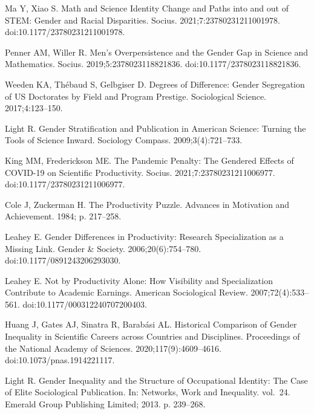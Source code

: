 \documentclass[
  10pt,
  letterpaper,
]{article}
\begin{document}
\begin{thebibliography}{10}
Ma Y, Xiao S.
\newblock Math and {{Science Identity Change}} and {{Paths}} into and out of {{STEM}}: {{Gender}} and {{Racial Disparities}}.
\newblock Socius. 2021;7:23780231211001978.
\newblock doi:{10.1177/23780231211001978}.

Penner AM, Willer R.
\newblock Men's {{Overpersistence}} and the {{Gender Gap}} in {{Science}} and {{Mathematics}}.
\newblock Socius. 2019;5:2378023118821836.
\newblock doi:{10.1177/2378023118821836}.

Weeden KA, Th{\'e}baud S, Gelbgiser D.
\newblock Degrees of Difference: {{Gender}} Segregation of {{US}} Doctorates by Field and Program Prestige.
\newblock Sociological Science. 2017;4:123--150.

Light R.
\newblock Gender Stratification and Publication in {{American}} Science: {{Turning}} the Tools of Science Inward.
\newblock Sociology Compass. 2009;3(4):721--733.

King MM, Frederickson ME.
\newblock The {{Pandemic Penalty}}: {{The Gendered Effects}} of {{COVID-19}} on {{Scientific Productivity}}.
\newblock Socius. 2021;7:23780231211006977.
\newblock doi:{10.1177/23780231211006977}.

Cole J, Zuckerman H.
\newblock The {{Productivity Puzzle}}.
\newblock Advances in Motivation and Achievement. 1984; p. 217--258.

Leahey E.
\newblock Gender {{Differences}} in {{Productivity}}: {{Research Specialization}} as a {{Missing Link}}.
\newblock Gender \& Society. 2006;20(6):754--780.
\newblock doi:{10.1177/0891243206293030}.

Leahey E.
\newblock Not by {{Productivity Alone}}: {{How Visibility}} and {{Specialization Contribute}} to {{Academic Earnings}}.
\newblock American Sociological Review. 2007;72(4):533--561.
\newblock doi:{10.1177/000312240707200403}.

Huang J, Gates AJ, Sinatra R, Barab{\'a}si AL.
\newblock Historical Comparison of Gender Inequality in Scientific Careers across Countries and Disciplines.
\newblock Proceedings of the National Academy of Sciences. 2020;117(9):4609--4616.
\newblock doi:{10.1073/pnas.1914221117}.

Light R.
\newblock Gender Inequality and the Structure of Occupational Identity: {{The}} Case of Elite Sociological Publication.
\newblock In: Networks, Work and Inequality. vol.~24. {Emerald Group Publishing Limited}; 2013. p. 239--268.


\end{thebibliography}
\end{document}

